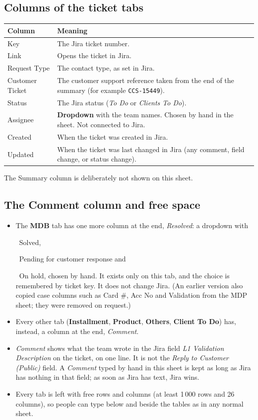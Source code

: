 \documentclass[11pt,a4paper]{article}
\newcommand{\code}[1]{\texttt{#1}}
\newcommand{\tab}[1]{\textbf{#1}}
\newcommand{\swatch}[1]{\colorbox{#1}{\rule{0pt}{1.6ex}\hspace{1.4em}}}
\let\oldsubsection\subsection
\renewcommand{\subsection}{\needspace{7\baselineskip}\oldsubsection}
\begin{document}
\subsection{Columns of the ticket tabs}
\begin{tabularx}{\linewidth}{@{}l L@{}}
\toprule
\textbf{Column} & \textbf{Meaning} \\
\midrule
Key & The Jira ticket number. \\
Link & Opens the ticket in Jira. \\
Request Type & The contact type, as set in Jira. \\
Customer Ticket & The customer support reference taken from the end of the summary (for example \code{CCS-15449}). \\
Status & The Jira status (\emph{To Do} or \emph{Clients To Do}). \\
Assignee & \textbf{Dropdown} with the team names. Chosen by hand in the sheet. Not connected to Jira. \\
Created & When the ticket was created in Jira. \\
Updated & When the ticket was last changed in Jira (any comment, field change, or status change). \\
\bottomrule
\end{tabularx}

The Summary column is deliberately not shown on this sheet.

\subsection{The Comment column and free space}
\label{sec:extra}
\begin{itemize}
  \item The \tab{MDB} tab has one more column at the end, \emph{Resolved}: a dropdown with \swatch{sheetgreen}~Solved,
    \swatch{sheetyellow}~Pending for customer response and \swatch{sheetred}~On hold, chosen by hand. It exists only on
    this tab, and the choice is remembered by ticket key. It does not change Jira. (An earlier version also copied case
    columns such as Card \#, Acc No and Validation from the MDP sheet; they were removed on request.)
  \item Every other tab (\tab{Installment}, \tab{Product}, \tab{Others}, \tab{Client To Do}) has, instead, a column at the
    end, \emph{Comment}.
  \item \emph{Comment} shows what the team wrote in the Jira field \emph{L1 Validation Description} on the ticket, on one
    line. It is not the \emph{Reply to Customer (Public)} field. A \emph{Comment} typed by hand in this sheet is kept as
    long as Jira has nothing in that field; as soon as Jira has text, Jira wins.
  \item Every tab is left with free rows and columns (at least 1\,000 rows and 26 columns), so people can type below and
    beside the tables as in any normal sheet.
\end{itemize}
\end{document}
